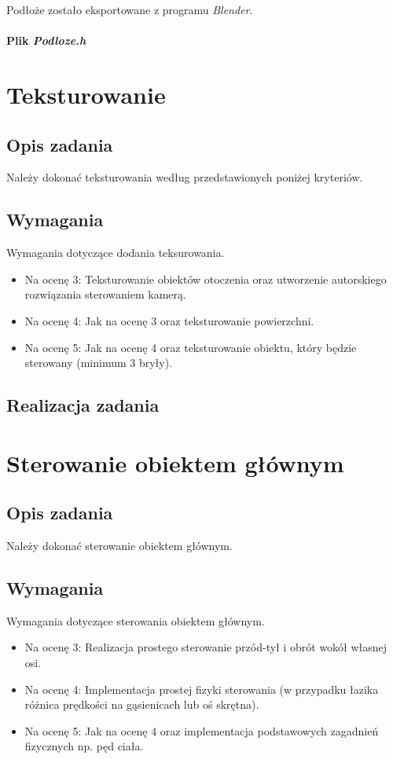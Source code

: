 \documentclass[a4paper, 12pt]{report}
\begin{document}
Podłoże zostało eksportowane z programu \emph{Blender}.

\subsubsection{Plik \emph{Podloze.h}}



\chapter{Teksturowanie}
\section{Opis zadania}

Należy dokonać teksturowania według przedstawionych poniżej kryteriów.
\section{Wymagania}

Wymagania dotyczące dodania teksurowania.
\begin{itemize}
\item Na ocenę 3: Teksturowanie obiektów otoczenia oraz utworzenie autorskiego rozwiązania sterowaniem kamerą.
\item Na ocenę 4: Jak na ocenę 3 oraz teksturowanie powierzchni.
\item Na ocenę 5: Jak na ocenę 4 oraz teksturowanie obiektu, który będzie sterowany (minimum 3 bryły).
\end{itemize}
\section{Realizacja zadania}



\chapter{Sterowanie obiektem głównym}
\section{Opis zadania}
Należy dokonać sterowanie obiektem głównym.
\section{Wymagania}
Wymagania dotyczące sterowania obiektem głównym.
\begin{itemize}
\item Na ocenę 3: Realizacja prostego sterowanie przód-tył i obrót wokół własnej osi.
\item Na ocenę 4: Implementacja prostej fizyki sterowania (w przypadku łazika różnica prędkości na gąsienicach lub oś skrętna).
\item Na ocenę 5: Jak na ocenę 4 oraz implementacja podstawowych zagadnień fizycznych np. pęd ciała.
\end{itemize}
\end{document}

